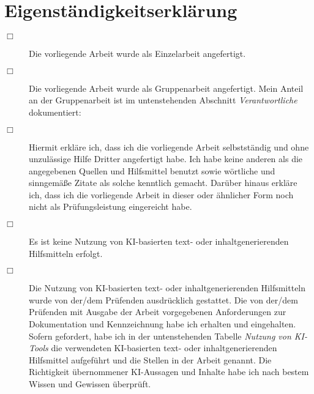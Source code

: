 \chapter{Eigenständigkeitserklärung}


\begin{small}

\begin{description}
\item[$\Box$] Die vorliegende Arbeit wurde als Einzelarbeit angefertigt.\\ %

\item[$\Box$] Die vorliegende Arbeit wurde als Gruppenarbeit angefertigt. Mein Anteil an der Gruppenarbeit ist im untenstehenden Abschnitt \emph{Verantwortliche} dokumentiert:\\

\vspace{1cm}

\item[$\Box$] Hiermit erkläre ich, dass ich die vorliegende Arbeit selbstständig und ohne unzulässige Hilfe Dritter angefertigt habe. Ich habe keine anderen als die angegebenen Quellen und Hilfsmittel benutzt sowie wörtliche und sinngemäße Zitate als solche kenntlich gemacht. Darüber hinaus erkläre ich, dass ich die vorliegende Arbeit in dieser oder ähnlicher Form noch nicht als Prüfungsleistung eingereicht habe.\\ %

\vspace{1cm}

\item[$\Box$] Es ist keine Nutzung von KI-basierten text- oder inhaltgenerierenden Hilfsmitteln erfolgt.\\

\item[$\Box$] Die Nutzung von KI-basierten text- oder inhaltgenerierenden Hilfsmitteln wurde von der/dem Prüfenden ausdrücklich gestattet. Die von der/dem Prüfenden mit Ausgabe der Arbeit vorgegebenen Anforderungen zur Dokumentation und Kennzeichnung habe ich erhalten und eingehalten. Sofern gefordert, habe ich in der untenstehenden Tabelle \emph{Nutzung von KI-Tools} die verwendeten KI-basierten text- oder inhaltgenerierenden Hilfsmittel aufgeführt und die Stellen in der Arbeit genannt. Die Richtigkeit übernommener KI-Aussagen und Inhalte habe ich nach bestem Wissen und Gewissen überprüft.\\ %
\end{description}


\end{small}
